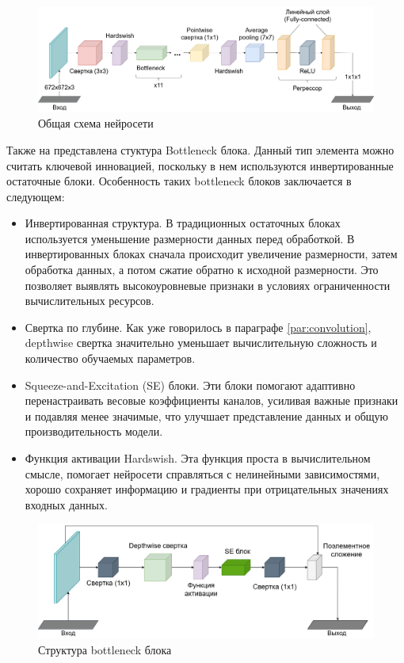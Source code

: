 \begin{figure}[ht] 
	\center
	\includegraphics [scale=0.3] {my_folder/images/FocusNet-Копия FocusNet.png}
	\caption{Общая схема нейросети} 
	\label{fig:FocusNet}
\end{figure}

Также на  представлена стуктура Bottleneck блока. Данный тип элемента можно считать ключевой инновацией, поскольку в нем используются инвертированные остаточные блоки. Особенность таких bottleneck блоков заключается в следующем:
\begin{itemize}
	\item Инвертированная структура. В традиционных остаточных блоках используется уменьшение размерности данных перед обработкой. В инвертированных блоках сначала происходит увеличение размерности, затем обработка данных, а потом сжатие обратно к исходной размерности. Это позволяет выявлять высокоуровневые признаки в условиях ограниченности вычислительных ресурсов.
	
	\item Свертка по глубине. Как уже говорилось в параграфе \ref{par:convolution}, depthwise свертка значительно уменьшает вычислительную сложность и количество обучаемых параметров.
	
	\item Squeeze-and-Excitation (SE) блоки. Эти блоки помогают адаптивно перенастраивать весовые коэффициенты каналов, усиливая важные признаки и подавляя менее значимые, что улучшает представление данных и общую производительность модели.
	
	\item Функция активации Hardswish. Эта функция проста в вычислительном смысле, помогает нейросети справляться с нелинейными зависимостями, хорошо сохраняет информацию и градиенты при отрицательных значениях входных данных.
\end{itemize}

\begin{figure}[ht] 
	\center
	\includegraphics [scale=0.4] {my_folder/images/FocusNet-Копия Bottleneck.png}
	\caption{Структура bottleneck блока}
	\label{fig:FocusNet-Bottleneck}
\end{figure}

